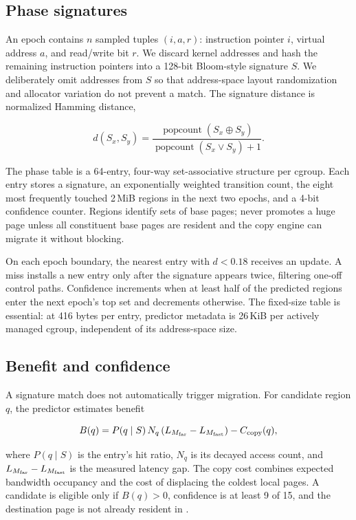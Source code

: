 \subsection{Phase signatures}

An epoch contains $n$ sampled tuples $(i,a,r)$: instruction pointer $i$,
virtual address $a$, and read/write bit $r$.  We discard kernel addresses and
hash the remaining instruction pointers into a 128-bit Bloom-style signature
$S$.  We deliberately omit addresses from $S$ so that address-space layout
randomization and allocator variation do not prevent a match.  The signature
distance is normalized Hamming distance,

\begin{equation}
  d(S_x,S_y)=\frac{\operatorname{popcount}(S_x\oplus S_y)}
                   {\operatorname{popcount}(S_x\lor S_y)+1}.
  \label{eq:distance}
\end{equation}

The phase table is a 64-entry, four-way set-associative structure per cgroup.
Each entry stores a signature, an exponentially weighted transition count,
the eight most frequently touched 2\,MiB regions in the next two epochs, and a
4-bit confidence counter.  Regions identify sets of base pages; \system never
promotes a huge page unless all constituent base pages are resident and the
copy engine can migrate it without blocking.

On each epoch boundary, the nearest entry with $d<0.18$ receives an update.  A
miss installs a new entry only after the signature appears twice, filtering
one-off control paths.  Confidence increments when at least half of the
predicted regions enter the next epoch's top set and decrements otherwise.
The fixed-size table is essential: at 416 bytes per entry, predictor metadata
is 26\,KiB per actively managed cgroup, independent of its address-space size.

\subsection{Benefit and confidence}

A signature match does not automatically trigger migration.  For candidate
region $q$, the predictor estimates benefit

\begin{equation}
  B(q)=P(q\mid S)\,N_q\,(L_{M_{\mathrm{far}}}-L_{M_{\mathrm{fast}}})-C_{\mathrm{copy}}(q),
  \label{eq:benefit}
\end{equation}

where $P(q\mid S)$ is the entry's hit ratio, $N_q$ is its decayed access count,
and $L_{M_{\mathrm{far}}}-L_{M_{\mathrm{fast}}}$ is the measured latency gap.  The copy cost combines
expected bandwidth occupancy and the cost of displacing the coldest local
pages.  A candidate is eligible only if $B(q)>0$, confidence is at least 9 of
15, and the destination page is not already resident in \fast.


